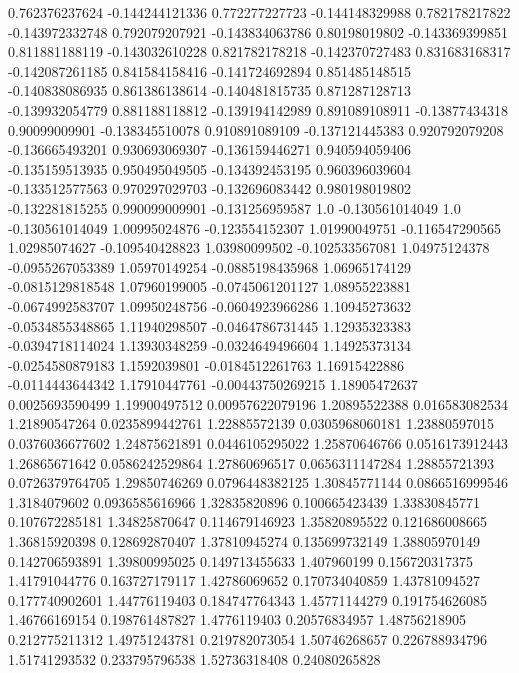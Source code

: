 0.762376237624  -0.144244121336
 0.772277227723  -0.144148329988
 0.782178217822  -0.143972332748
 0.792079207921  -0.143834063786
  0.80198019802  -0.143369399851
 0.811881188119  -0.143032610228
 0.821782178218  -0.142370727483
 0.831683168317  -0.142087261185
 0.841584158416  -0.141724692894
 0.851485148515  -0.140838086935
 0.861386138614  -0.140481815735
 0.871287128713  -0.139932054779
 0.881188118812  -0.139194142989
 0.891089108911   -0.13877434318
  0.90099009901  -0.138345510078
 0.910891089109  -0.137121445383
 0.920792079208  -0.136665493201
 0.930693069307  -0.136159446271
 0.940594059406  -0.135159513935
 0.950495049505  -0.134392453195
 0.960396039604  -0.133512577563
 0.970297029703  -0.132696083442
 0.980198019802  -0.132281815255
 0.990099009901  -0.131256959587
            1.0  -0.130561014049
            1.0  -0.130561014049
  1.00995024876  -0.123554152307
  1.01990049751  -0.116547290565
  1.02985074627  -0.109540428823
  1.03980099502  -0.102533567081
  1.04975124378  -0.0955267053389
  1.05970149254  -0.0885198435968
  1.06965174129  -0.0815129818548
  1.07960199005  -0.0745061201127
  1.08955223881  -0.0674992583707
  1.09950248756  -0.0604923966286
  1.10945273632  -0.0534855348865
  1.11940298507  -0.0464786731445
  1.12935323383  -0.0394718114024
  1.13930348259  -0.0324649496604
  1.14925373134  -0.0254580879183
   1.1592039801  -0.0184512261763
  1.16915422886  -0.0114443644342
  1.17910447761  -0.00443750269215
  1.18905472637  0.0025693590499
  1.19900497512  0.00957622079196
  1.20895522388   0.016583082534
  1.21890547264  0.0235899442761
  1.22885572139  0.0305968060181
  1.23880597015  0.0376036677602
  1.24875621891  0.0446105295022
  1.25870646766  0.0516173912443
  1.26865671642  0.0586242529864
  1.27860696517  0.0656311147284
  1.28855721393  0.0726379764705
  1.29850746269  0.0796448382125
  1.30845771144  0.0866516999546
   1.3184079602  0.0936585616966
  1.32835820896   0.100665423439
  1.33830845771   0.107672285181
  1.34825870647   0.114679146923
  1.35820895522   0.121686008665
  1.36815920398   0.128692870407
  1.37810945274   0.135699732149
  1.38805970149   0.142706593891
  1.39800995025   0.149713455633
    1.407960199   0.156720317375
  1.41791044776   0.163727179117
  1.42786069652   0.170734040859
  1.43781094527   0.177740902601
  1.44776119403   0.184747764343
  1.45771144279   0.191754626085
  1.46766169154   0.198761487827
   1.4776119403    0.20576834957
  1.48756218905   0.212775211312
  1.49751243781   0.219782073054
  1.50746268657   0.226788934796
  1.51741293532   0.233795796538
  1.52736318408    0.24080265828
